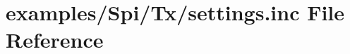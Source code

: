 \hypertarget{examples_2Spi_2Tx_2settings_8inc}{}\section{examples/\+Spi/\+Tx/settings.inc File Reference}
\label{examples_2Spi_2Tx_2settings_8inc}
